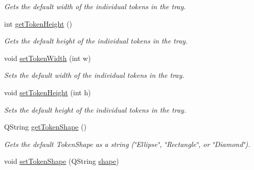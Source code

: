 \begin{DoxyCompactItemize}
\begin{DoxyCompactList}\small\item\em Gets the default width of the individual tokens in the tray. \end{DoxyCompactList}\item 
\hypertarget{class_picto_1_1_token_tray_graphic_a6d7942a4a3283af8ae9e99028272c86c}{int \hyperlink{class_picto_1_1_token_tray_graphic_a6d7942a4a3283af8ae9e99028272c86c}{get\-Token\-Height} ()}\label{class_picto_1_1_token_tray_graphic_a6d7942a4a3283af8ae9e99028272c86c}

\begin{DoxyCompactList}\small\item\em Gets the default height of the individual tokens in the tray. \end{DoxyCompactList}\item 
\hypertarget{class_picto_1_1_token_tray_graphic_aa3dbd9bb0b08abea7808f3d0fffacad4}{void \hyperlink{class_picto_1_1_token_tray_graphic_aa3dbd9bb0b08abea7808f3d0fffacad4}{set\-Token\-Width} (int w)}\label{class_picto_1_1_token_tray_graphic_aa3dbd9bb0b08abea7808f3d0fffacad4}

\begin{DoxyCompactList}\small\item\em Sets the default width of the individual tokens in the tray. \end{DoxyCompactList}\item 
\hypertarget{class_picto_1_1_token_tray_graphic_a1bdd7d612997cafe5d685f2e10c04e2d}{void \hyperlink{class_picto_1_1_token_tray_graphic_a1bdd7d612997cafe5d685f2e10c04e2d}{set\-Token\-Height} (int h)}\label{class_picto_1_1_token_tray_graphic_a1bdd7d612997cafe5d685f2e10c04e2d}

\begin{DoxyCompactList}\small\item\em Sets the default height of the individual tokens in the tray. \end{DoxyCompactList}\item 
\hypertarget{class_picto_1_1_token_tray_graphic_aeabef7a0079764911d4e5cf6fe20c42c}{Q\-String \hyperlink{class_picto_1_1_token_tray_graphic_aeabef7a0079764911d4e5cf6fe20c42c}{get\-Token\-Shape} ()}\label{class_picto_1_1_token_tray_graphic_aeabef7a0079764911d4e5cf6fe20c42c}

\begin{DoxyCompactList}\small\item\em Gets the default Token\-Shape as a string (\char`\"{}\-Ellipse\char`\"{}, \char`\"{}\-Rectangle\char`\"{}, or \char`\"{}\-Diamond\char`\"{}). \end{DoxyCompactList}\item 
\hypertarget{class_picto_1_1_token_tray_graphic_a3e202918c2deb699bb34735b9f7a1fb8}{void \hyperlink{class_picto_1_1_token_tray_graphic_a3e202918c2deb699bb34735b9f7a1fb8}{set\-Token\-Shape} (Q\-String \hyperlink{class_picto_1_1_token_tray_graphic_a8635ae2a3b7939007fae31ea013ae06b}{shape})}\label{class_picto_1_1_token_tray_graphic_a3e202918c2deb699bb34735b9f7a1fb8}


\end{DoxyCompactItemize}
